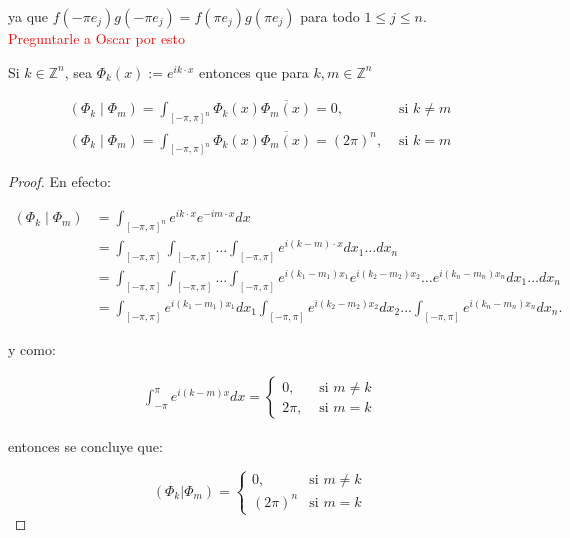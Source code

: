 \documentclass[12pt]{article}
\begin{document}
ya que $f(-\pi e_j)g(-\pi e_j)=f(\pi e_j)g(\pi e_j)$ para todo $1\leq j\leq n$.\\

\textcolor{red}{Preguntarle a Oscar por esto}

\begin{theorem}
Si $k \in \mathbb{Z}^n$, sea $\Phi_k(x):=e^{i k \cdot x}$ entonces que para $k, m \in \mathbb{Z}^n$

$$
\begin{array}{ll}
\displaystyle\left(\Phi_k \mid \Phi_m\right)=\int_{[-\pi, \pi]^n} \Phi_k(x) \overline{\Phi_m(x)}=0, & \text { si } k \neq m \\
\displaystyle\left(\Phi_k \mid \Phi_m\right)=\int_{[-\pi, \pi]^n} \Phi_k(x) \overline{\Phi_m(x)}=(2 \pi)^n, & \text { si } k=m
\end{array}
$$
\end{theorem}

\begin{proof}
En efecto:

\begin{align*}
    \left(\Phi_k \mid \Phi_m\right)&=\int_{[-\pi,\pi]^n}e^{ik \cdot x}e^{-im\cdot x}dx\\
    &=\int_{[-\pi,\pi]}\int_{[-\pi,\pi]}\ldots \int_{[-\pi,\pi]}e^{i(k-m) \cdot x}dx_1\ldots dx_n\\
    &=\int_{[-\pi,\pi]}\int_{[-\pi,\pi]}\ldots \int_{[-\pi,\pi]}e^{i(k_1-m_1) x_1}e^{i(k_2-m_2) x_2}\ldots e^{i(k_n-m_n) x_n}dx_1\ldots dx_n\\
    &=\int_{[-\pi,\pi]}e^{i(k_1-m_1) x_1}dx_1\int_{[-\pi,\pi]}e^{i(k_2-m_2) x_2}dx_2\ldots \int_{[-\pi,\pi]} e^{i(k_n-m_n) x_n}dx_n
.\end{align*}

y como:

$$
\begin{aligned}
\int_{-\pi}^\pi e^{i(k-m)x} d x= \begin{cases}0, & \text { si } m \neq k \\
2 \pi, & \text { si } m=k\end{cases}
\end{aligned}
$$

entonces se concluye que:

$$(\Phi_k|\Phi_m)=\begin{cases}
0, \quad &\text{si } m\neq k\\
(2\pi)^n &\text{si } m=k
\end{cases}$$

\end{proof}
\end{document}
